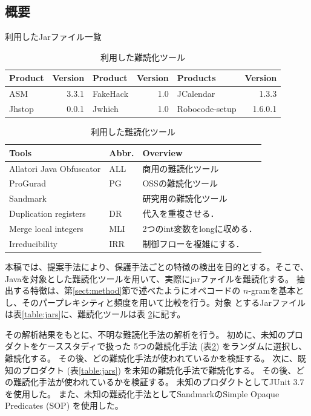\documentclass[a4j,fleqn,10pt]{jarticle}
\begin{document}
\subsection{概要}

\begin{table}[t]
  \centering
  \footnotesize{
    \caption{利用したJarファイル一覧}\label{table:jars}
  \begin{tabular}{l|r||l|r||l|r}
    Product & Version & Product & Version & Products & Version \\ \hline
    ASM       & 3.3.1 & FakeHack  & 1.0 &JCalendar & 1.3.3   \\
    Jhstop    & 0.0.1 & Jwhich    & 1.0   & Robocode-setup & 1.6.0.1 
  \end{tabular}
  \caption{利用した難読化ツール}\label{table:tools}
  \begin{tabular}{ll|l}
      Tools & Abbr. & Overview \\ \hline
      Allatori Java Obfuscator & ALL & 商用の難読化ツール \\ \hline
      ProGurad                 & PG & OSSの難読化ツール \\ \hline
      Sandmark                 & & 研究用の難読化ツール \\
      \hspace{0.2cm} Duplication registers & DR & 代入を重複させる．\\
      \hspace{0.2cm} Merge local integers & MLI & 2つのint変数をlongに収める．\\
      \hspace{0.2cm} Irreducibility       & IRR & 制御フローを複雑にする．\\
  \end{tabular}}
\end{table}

本稿では、提案手法により、保護手法ごとの特徴の検出を目的とする。そこで、
Javaを対象とした難読化ツールを用いて、実際にjarファイルを難読化する。
抽出する特徴は、第\ref{sect:method}節で述べたようにオペコードの
$n$-gramを基本とし、そのパープレキシティと頻度を用いて比較を行う。対象
とするJarファイルは表\ref{table:jars}に、難読化ツールは表
\ref{table:tools}に記す。

その解析結果をもとに、不明な難読化手法の解析を行う。
初めに、未知のプロダクトをケーススタディで扱った
5つの難読化手法 (表\ref{table:tools}) をランダムに選択し、難読化する。
その後、どの難読化手法が使われているかを検証する。
次に、既知のプロダクト (表\ref{table:jars}) を未知の難読化手法で難読化する。
その後、どの難読化手法が使われているかを検証する。
未知のプロダクトとしてJUnit 3.7を使用した。
また、未知の難読化手法としてSandmarkのSimple Opaque Predicates (SOP) を使用した。
\end{document}
